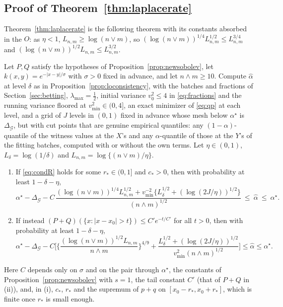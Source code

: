 \subsection{Proof of Theorem~\ref{thm:laplacerate}}
\label{sec:laplaceproof}

Theorem~\ref{thm:laplacerate} is the following theorem with its constants absorbed in the $O$: as $\eta<1$,
$L_{n,m}\ge\log(n\vee m)$, so $(\log(n\vee m))^{1/4}L_{n,m}^{1/2}\le L_{n,m}^{3/4}$ and
$(\log(n\vee m))^{1/2}L_{n,m}\le L_{n,m}^{3/2}$.

\begin{theorem}
\label{thm:laplaceconst}
Let $P,Q$ satisfy the hypotheses of Proposition~\ref{prop:newsobolev}, let $k(x,y)=e^{-|x-y|/\sigma}$ with $\sigma>0$
fixed in advance, and let $n\wedge m\ge10$. Compute $\widehat\alpha$ at level $\delta$ as in
Proposition~\ref{prop:loconsistency}, with the batches and fractions of Section~\ref{sec:betting},
$\lambda_{\max}=\tfrac12$, initial variance $v_0^2\le4$ in \eqref{eq:fractions} and the running variance floored at
$v^2_{\min}\in(0,4]$, an exact minimizer of \eqref{eq:qp} at each level, and a grid of $J$ levels in $(0,1)$ fixed
in advance whose mesh below $\alpha^\star$ is $\Delta_{\mathcal G}$, but with cut points that are genuine empirical
quantiles: any $(1-\alpha)$-quantile of the witness values at the $X$'s and any $\alpha$-quantile of those at the
$Y$'s of the fitting batches, computed with or without the own terms. Let $\eta\in(0,1)$, $L_\delta=\log(1/\delta)$
and $L_{n,m}=\log\{(n\vee m)/\eta\}$.
\begin{enumerate}[label=(\roman*),leftmargin=*]
\item If \eqref{eq:condR} holds for some $r_\ast\in(0,1]$ and $c_\ast>0$, then with probability at least $1-\delta-\eta$,
\[
\alpha^\star-\Delta_{\mathcal G}-C\,\frac{(\log(n\vee m))^{1/4}L_{n,m}^{1/2}
+v_{\min}^{-2}\{L_\delta^{1/2}+(\log(2J/\eta))^{1/2}\}}{(n\wedge m)^{1/2}}
\ \le\ \widehat\alpha\ \le\ \alpha^\star .
\]
\item If instead $(P+Q)(\{x:|x-x_0|>t\})\le C'e^{-t/C'}$ for all $t>0$, then with probability at least
$1-\delta-\eta$,
\[
\alpha^\star-\Delta_{\mathcal G}-C\bigg[\bigg\{\frac{(\log(n\vee m))^{1/2}L_{n,m}}{n\wedge m}\bigg\}^{4/9}
+\frac{L_\delta^{1/2}+(\log(2J/\eta))^{1/2}}{v_{\min}^{2}(n\wedge m)^{1/2}}\bigg]
\le\widehat\alpha\le\alpha^\star .
\]
\end{enumerate}
Here $C$ depends only on $\sigma$ and on the pair through $\alpha^\star$, the constants of
Proposition~\ref{prop:newsobolev} with $s=1$, the tail constant $C'$ (that of $P+Q$ in (ii)), and, in (i), $c_\ast$, $r_\ast$ and
the supremum of $p+q$ on $[x_0-r_\ast,x_0+r_\ast]$, which is finite once $r_\ast$ is small enough.
\end{theorem}

